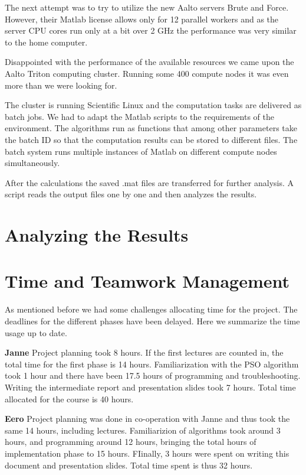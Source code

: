 \documentclass[twoside]{article}
\begin{document}
\begin{multicols}{2}
The next attempt was to try to utilize the new Aalto servers Brute and Force. However, their Matlab license allows only for 12 parallel workers and as the server CPU cores run only at a bit over 2 GHz the performance was very similar to the home computer.

Disappointed with the performance of the available resources we came upon the Aalto Triton computing cluster. Running some 400 compute nodes it was even more than we were looking for.

The cluster is running Scientific Linux and the computation tasks are delivered as batch jobs. We had to adapt the Matlab scripts to the requirements of the environment. The algorithms run as functions that among other parameters take the batch ID so that the computation results can be stored to different files. The batch system runs multiple instances of Matlab on different compute nodes simultaneously. 

After the calculations the saved .mat files are transferred for further analysis. A script reads the output files one by one and then analyzes the results.



\section{Analyzing the Results}


\section{Time and Teamwork Management}

As mentioned before we had some challenges allocating time for the project. The deadlines for the different phases have been delayed. Here we summarize the time usage up to date.

\textbf{Janne} Project planning took 8 hours. If the first lectures are counted in, the total time for the first phase is 14 hours. Familiarization with the PSO algorithm took 1 hour and there have been 17.5 hours of programming and troubleshooting. Writing the intermediate report and presentation slides took 7 hours. Total time allocated for the course is 40 hours.

\textbf{Eero} Project planning was done in co-operation with Janne and thus took the same 14 hours, including lectures. Familiarizion of algorithms took around 3 hours,  and programming around 12 hours, bringing the total hours of implementation phase to 15 hours. FIinally, 3 hours were spent on writing this document and presentation slides. Total time spent is thus 32 hours.








\end{multicols}
\end{document}
